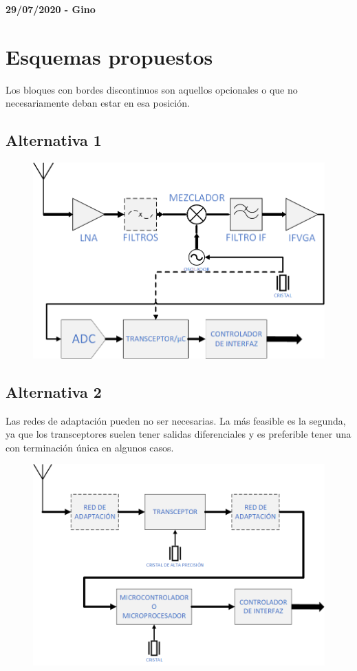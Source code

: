 \documentclass[a4paper,12pt]{report} %
\begin{document}
\textbf{29/07/2020 - Gino}

\section{Esquemas propuestos}

Los bloques con bordes discontinuos son aquellos opcionales o que no necesariamente deban estar en esa posición.

\subsection{Alternativa 1}

\begin{figure}[H]
	\centering
	\includegraphics[scale=0.6]{Imagenes/Arquitectura/diagrama1}
\end{figure}

\subsection{Alternativa 2}

Las redes de adaptación pueden no ser necesarias. La más feasible es la segunda, ya que los transceptores suelen tener salidas diferenciales y es preferible tener una con terminación única en algunos casos.

\begin{figure}[H]
	\centering
	\includegraphics[scale=0.6]{Imagenes/Arquitectura/diagrama2}
\end{figure}
\end{document}
